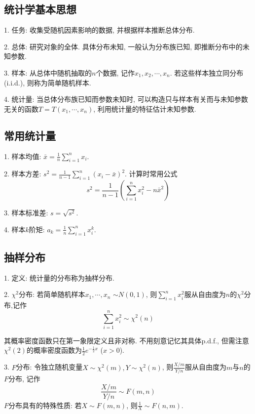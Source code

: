 \subsection{统计学基本思想}

1. 任务: 收集受随机因素影响的数据, 并根据样本推断总体分布. 

2. 总体: 研究对象的全体. 具体分布未知, 一般认为分布族已知, 即推断分布中的未知参数.

3. 样本: 从总体中随机抽取的$n$个数据, 记作$x_1,x_2,\cdots,x_n$. 若这些样本独立同分布 (i.i.d.), 则称为简单随机样本.

4. 统计量: 当总体分布族已知而参数未知时, 可以构造只与样本有关而与未知参数无关的函数$T=T(x_1,\cdots, x_n)$, 利用统计量的特征估计未知参数.

\subsection{常用统计量}

1. 样本均值: $\bar{x}=\frac{1}{n}\sum\limits_{i=1}^n x_i$.

2. 样本方差: $s^2=\frac{1}{n-1}\sum\limits_{i=1}^n (x_i-\bar{x})^2$. 计算时常用公式
\begin{equation*}
    s^2=\frac{1}{n-1}(\sum\limits_{i=1}^n x_i^2 - n\bar{x}^2)
\end{equation*}

3. 样本标准差: $s=\sqrt{s^2}$.

4. 样本$k$阶矩: $a_k=\frac{1}{n}\sum\limits_{i=1}^n x_i^k$.

\subsection{抽样分布}

1. 定义: 统计量的分布称为抽样分布.

2. $\chi^2$分布: 若简单随机样本$x_1,\cdots,x_n$ $\sim N(0,1)$, 则$\sum\limits_{i=1}^n x_i^2$服从自由度为$n$的$\chi^2$分布,记作
\begin{equation*}
    \sum\limits_{i=1}^n x_i^2 \sim \chi^2(n)
\end{equation*}

其概率密度函数只在第一象限定义且非对称. 不用刻意记忆其具体p.d.f., 但需注意$\chi^2(2)$的概率密度函数为$\frac{1}{2}e^{-\frac{1}{2}x}$ ($x>0$).

3. $F$分布: 令独立随机变量$X \sim \chi^2(m), Y \sim \chi^2(n)$, 则$\frac{X/m}{Y/n}$服从自由度为$m$与$n$的$F$分布, 记作
\begin{equation*}
    \frac{X/m}{Y/n} \sim F(m,n)
\end{equation*}
$F$分布具有的特殊性质: 若$X \sim F(m,n)$, 则$\frac{1}{X} \sim F(n,m)$.

